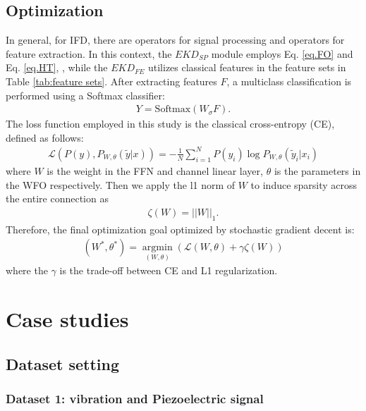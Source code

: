 \documentclass[lettersize,journal]{IEEEtran}
\begin{document}
\subsection{Optimization} 
In general, for IFD, there are operators for signal processing and operators for feature extraction. In this context, the $EKD_{SP}$ module employs Eq. \ref{eq.FO} and Eq. \ref{eq.HT}, , while the $EKD_{FE}$ utilizes classical features in the feature sets in Table \ref{tab:feature sets}. After extracting features $F$, a multiclass classification is performed using a Softmax classifier:
\begin{align}
    Y = \text{Softmax}(W_{\sigma}{F})\label{classifier layer}.
\end{align}
The loss function employed in this study is the classical cross-entropy (CE), defined as follows: 
\begin{align}
    \mathcal{L}(P(y),{P_{W,\theta }}(\tilde y|x)) =  - \frac{1}{N} {\sum\limits_{i = 1}^N {P({y_i})\log {P_{W,\theta }}({{\tilde y}_i}|{x_i})} } 
\end{align}
where $W$ is the weight in the FFN and channel linear layer, $\theta$ is the parameters in the WFO respectively.  Then we apply the l1 norm of $W$ to induce sparsity across the entire connection as
\begin{align}
   \zeta (W) = ||W||_1.
\end{align}
Therefore, the final optimization goal optimized by stochastic gradient decent  \cite{Kingma2015} is:
\begin{align}
\label{target}
    \left( {{W^*},{\theta ^*}} \right) = \mathop {\arg \min }\limits_{(W ,\theta )} (\mathcal{L}(W ,\theta ) + \gamma \zeta (W))
\end{align}
 where the $\gamma$  is the trade-off between CE and L1 regularization. 

\section{Case studies}
\subsection{Dataset setting}\label{section.setting}
\subsubsection{Dataset 1: vibration and Piezoelectric signal}
\end{document}
